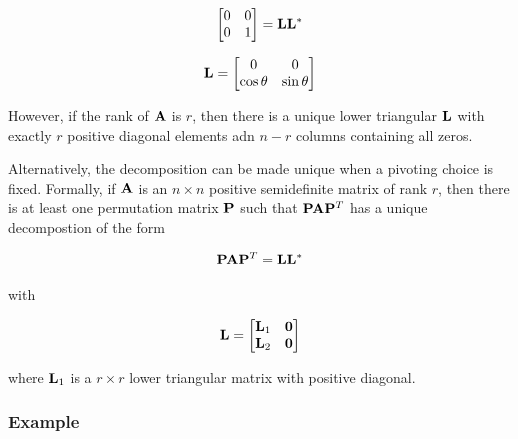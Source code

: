 \begin{equation}
    \begin{bmatrix}
        0 & 0 \\
        0 & 1\\
    \end{bmatrix}
    = \mathbf{L} \mathbf{L}^*
\end{equation}

\begin{equation}
    \mathbf{L} =
    \begin{bmatrix}
        0 & 0 \\
        \cos \theta & \sin \theta
    \end{bmatrix}
\end{equation}

However, if the rank of $ \mathbf{A} $ is $ r $, then there is a unique lower triangular
$ \mathbf{L} $ with exactly $ r $ positive diagonal elements adn $ n - r $ columns
containing all zeros.

Alternatively, the decomposition can be made unique when  a pivoting choice is
fixed. Formally, if $ \mathbf{A} $ is an $ n \times n $ positive semidefinite matrix
of rank $ r $, then there is at least one permutation matrix $ \mathbf{P} $ such
that $ \mathbf{P} \mathbf{A} \mathbf{P}^T $ has a unique decompostion of the form

\begin{equation}
    \mathbf{P} \mathbf{A} \mathbf{P}^T = \mathbf{L} \mathbf{L}^*
\end{equation}

with

\begin{equation}
    \mathbf{L} = \begin{bmatrix}
        \mathbf{L}_1 & \mathbf{0} \\
        \mathbf{L}_2 & \mathbf{0} \\
    \end{bmatrix}
\end{equation}

where $ \mathbf{L}_1 $ is a $ r \times r $ lower triangular matrix with positive
diagonal.


\subsubsection{Example}

